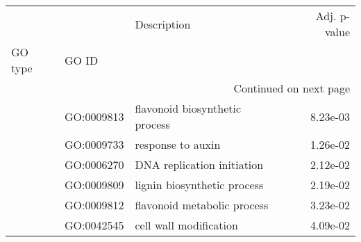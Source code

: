 \begin{longtable}{lllr}
\toprule
   &            &                     Description &  Adj. p-value \\
GO type & GO ID &                                 &               \\
\midrule
\endhead
\midrule
\multicolumn{4}{r}{{Continued on next page}} \\
\midrule
\endfoot

\bottomrule
\endlastfoot
\multirow{6}{*}{BP} & GO:0009813 &  flavonoid biosynthetic process &      8.23e-03 \\
   & GO:0009733 &               response to auxin &      1.26e-02 \\
   & GO:0006270 &      DNA replication initiation &      2.12e-02 \\
   & GO:0009809 &     lignin biosynthetic process &      2.19e-02 \\
   & GO:0009812 &     flavonoid metabolic process &      3.23e-02 \\
   & GO:0042545 &          cell wall modification &      4.09e-02 \\
\end{longtable}